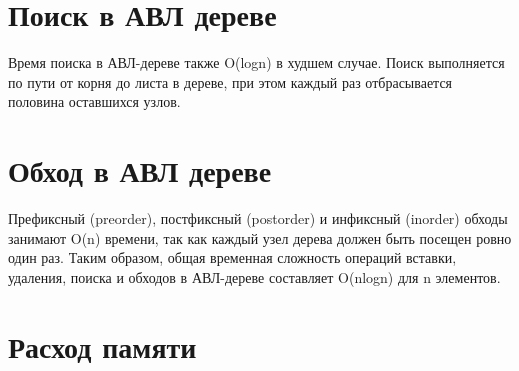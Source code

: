 \documentclass[bachelor, och, referat, times]{SCWorks}
\begin{document}
 \section{Поиск в АВЛ дереве}

Время поиска в АВЛ-дереве также O(logn) в худшем случае.
Поиск выполняется по пути от корня до листа в дереве, 
при этом каждый раз отбрасывается половина оставшихся узлов.


 \section{Обход в АВЛ дереве}

Префиксный (preorder), постфиксный (postorder) и инфиксный (inorder) обходы занимают 
O(n) времени, так как каждый узел дерева должен быть посещен ровно один раз.
Таким образом, общая временная сложность операций вставки, удаления, 
поиска и обходов в АВЛ-дереве составляет O(nlogn) для n элементов.


  \section{Расход памяти}
\end{document}

